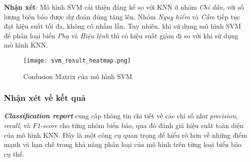 \documentclass[a4paper,12pt]{article}
\begin{document}
\textbf{Nhận xét}:  
Mô hình SVM cải thiện đáng kể so với KNN ở nhóm \textit{Chỉ dẫn}, với số lượng biển báo được dự đoán đúng tăng lên. Nhóm \textit{Nguy hiểm} và \textit{Cấm} tiếp tục đạt hiệu suất tối đa, không có nhầm lẫn. Tuy nhiên, khi sử dụng mô hình SVM để phân loại biển \textit{Phụ} và \textit{Hiệu lệnh} thì có hiệu suất giảm đi so với khi sử dụng mô hình KNN.

\begin{figure}[H]
    \centering
    \texttt{[image: svm\_result\_heatmap.png]}
    \caption{Confusion Matrix của mô hình SVM}
    \label{fig:svm_confusion_matrix}
\end{figure}

\subsubsection{Nhận xét về kết quả}

\textbf{\textit{Classification report}} cung cấp thông tin chi tiết về các chỉ số như \textit{precision}, \textit{recall}, và \textit{F1-score} cho từng nhóm biển báo, qua đó đánh giá hiệu suất toàn diện của mô hình KNN. Đây là một công cụ quan trọng để hiểu rõ hơn về những điểm mạnh và hạn chế trong khả năng phân loại của mô hình trên từng loại biển báo cụ thể.  
\end{document}
